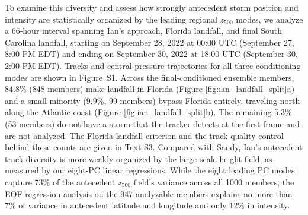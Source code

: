 \documentclass[final]{agujournal2019}
\begin{document}
To examine this diversity and assess how strongly antecedent storm position and intensity are statistically organized by the leading regional $z_{500}$ modes, we analyze a 66-hour interval spanning Ian's approach, Florida landfall, and final South Carolina landfall, starting on September 28, 2022 at 00:00 UTC (September 27, 8:00 PM EDT) and ending on September 30, 2022 at 18:00 UTC (September 30, 2:00 PM EDT). Tracks and central-pressure trajectories for all three conditioning modes are shown in Figure~S1. Across the final-conditioned ensemble members, $84.8\%$ (848 members) make landfall in Florida (Figure \ref{fig:ian_landfall_split}a) and a small minority ($9.9\%$, 99 members) bypass Florida entirely, traveling north along the Atlantic coast (Figure \ref{fig:ian_landfall_split}b). The remaining $5.3\%$ (53 members) do not have a storm that the tracker detects at the first frame and are not analyzed. The Florida-landfall criterion and the track quality control behind these counts are given in Text S3. Compared with Sandy, Ian's antecedent track diversity is more weakly organized by the large-scale height field, as measured by our eight-PC linear regressions. While the eight leading PC modes capture 73\% of the antecedent $z_{500}$ field's variance across all 1000 members, the EOF regression analysis on the 947 analyzable members explains no more than $7\%$ of variance in antecedent latitude and longitude and only $12\%$ in intensity.
\end{document}
